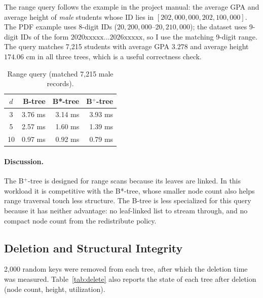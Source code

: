 \documentclass[sigconf]{acmart}
\begin{document}
The range query follows the example in the project manual: the
average GPA and average height of \emph{male} students whose ID lies
in $[202{,}000{,}000, 202{,}100{,}000]$. The PDF example uses
8-digit IDs ($20{,}200{,}000$--$20{,}210{,}000$); the dataset uses
9-digit IDs of the form $2020\text{xxxxx}\dots 2026\text{xxxxx}$, so
I use the matching 9-digit range. The query matches 7{,}215
students with average GPA $3.278$ and average height $174.06$ cm in
all three trees, which is a useful correctness check.

\begin{table}[h]
\centering
\small
\caption{Range query (matched 7{,}215 male records).}
\label{tab:range}
\begin{tabular}{c rrr}
\toprule
$d$ & B-tree & B*-tree & B$^+$-tree \\
\midrule
3  & 3.76 ms & 3.14 ms & 3.93 ms \\
5  & 2.57 ms & 1.60 ms & 1.39 ms \\
10 & 0.97 ms & 0.92 ms & 0.79 ms \\
\bottomrule
\end{tabular}
\end{table}

\paragraph{Discussion.} The B$^+$-tree is designed for range scans
because its leaves are linked. In this workload it is competitive with
the B*-tree, whose smaller node count also helps range traversal touch
less structure. The B-tree is less specialized for this query because
it has neither advantage: no leaf-linked list to stream through, and
no compact node count from the redistribute policy.

\subsection{Deletion and Structural Integrity}

2{,}000 random keys were removed from each tree, after which the
deletion time was measured. Table~\ref{tab:delete} also reports the
state of each tree after deletion (node count, height, utilization).
\end{document}
